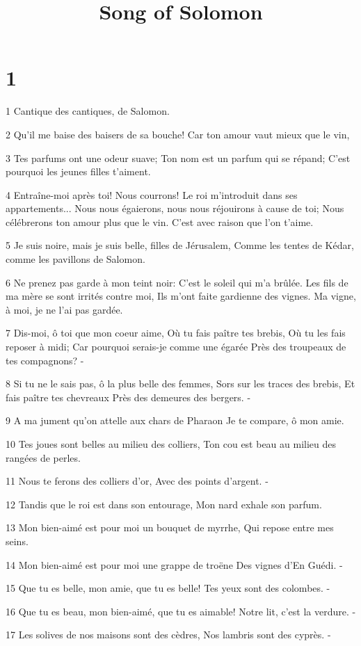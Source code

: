 

\title{Song of Solomon}


\chapter{1}

\par 1 Cantique des cantiques, de Salomon.
\par 2 Qu'il me baise des baisers de sa bouche! Car ton amour vaut mieux que le vin,
\par 3 Tes parfums ont une odeur suave; Ton nom est un parfum qui se répand; C'est pourquoi les jeunes filles t'aiment.
\par 4 Entraîne-moi après toi! Nous courrons! Le roi m'introduit dans ses appartements... Nous nous égaierons, nous nous réjouirons à cause de toi; Nous célébrerons ton amour plus que le vin. C'est avec raison que l'on t'aime.
\par 5 Je suis noire, mais je suis belle, filles de Jérusalem, Comme les tentes de Kédar, comme les pavillons de Salomon.
\par 6 Ne prenez pas garde à mon teint noir: C'est le soleil qui m'a brûlée. Les fils de ma mère se sont irrités contre moi, Ils m'ont faite gardienne des vignes. Ma vigne, à moi, je ne l'ai pas gardée.
\par 7 Dis-moi, ô toi que mon coeur aime, Où tu fais paître tes brebis, Où tu les fais reposer à midi; Car pourquoi serais-je comme une égarée Près des troupeaux de tes compagnons? -
\par 8 Si tu ne le sais pas, ô la plus belle des femmes, Sors sur les traces des brebis, Et fais paître tes chevreaux Près des demeures des bergers. -
\par 9 A ma jument qu'on attelle aux chars de Pharaon Je te compare, ô mon amie.
\par 10 Tes joues sont belles au milieu des colliers, Ton cou est beau au milieu des rangées de perles.
\par 11 Nous te ferons des colliers d'or, Avec des points d'argent. -
\par 12 Tandis que le roi est dans son entourage, Mon nard exhale son parfum.
\par 13 Mon bien-aimé est pour moi un bouquet de myrrhe, Qui repose entre mes seins.
\par 14 Mon bien-aimé est pour moi une grappe de troëne Des vignes d'En Guédi. -
\par 15 Que tu es belle, mon amie, que tu es belle! Tes yeux sont des colombes. -
\par 16 Que tu es beau, mon bien-aimé, que tu es aimable! Notre lit, c'est la verdure. -
\par 17 Les solives de nos maisons sont des cèdres, Nos lambris sont des cyprès. -

